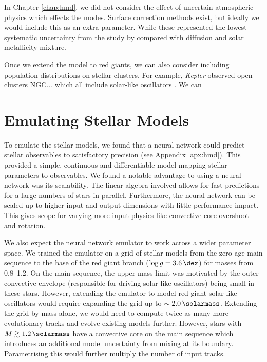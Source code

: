 In Chapter \ref{chap:hmd}, we did not consider the effect of uncertain atmospheric physics which effects the modes. Surface correction methods exist, but ideally we would include this as an extra parameter. While these represented the lowest systematic uncertainty from the study by \citet{Nsamba.Campante.ea2018} compared with diffusion and solar metallicity mixture.

Once we extend the model to red giants, we can also consider including population distributions on stellar clusters. For example, \emph{Kepler} observed open clusters NGC... which all include solar-like oscillators \needcite. We can 

\section{Emulating Stellar Models}\label{sec:conc-nn}

To emulate the stellar models, we found that a neural network could predict stellar observables to satisfactory precision (see Appendix \ref{apx:hmd}). This provided a simple, continuous and differentiable model mapping stellar parameters to observables. We found a notable advantage to using a neural network was its scalability. The linear algebra involved allows for fast predictions for a large numbers of stars in parallel. Furthermore, the neural network can be scaled up to higher input and output dimensions with little performance impact. This gives scope for varying more input physics like convective core overshoot and rotation.

We also expect the neural network emulator to work across a wider parameter space. We trained the emulator on a grid of stellar models from the zero-age main sequence to the base of the red giant branch (\(\log g = \SI{3.6}{\dex}\)) for masses from \SIrange{0.8}{1.2}{\solarmass}. On the main sequence, the upper mass limit was motivated by the outer convective envelope (responsible for driving solar-like oscillators) being small in these stars. However, extending the emulator to model red giant solar-like oscillators would require expanding the grid up to \(\sim\SI{2.0}{\solarmass}\). Extending the grid by mass alone, we would need to compute twice as many more evolutionary tracks and evolve existing models further. However, stars with \(M \gtrsim \SI{1.2}{\solarmass}\) have a convective core on the main sequence which introduces an additional model uncertainty from mixing at its boundary. Parametrising this would further multiply the number of input tracks.

